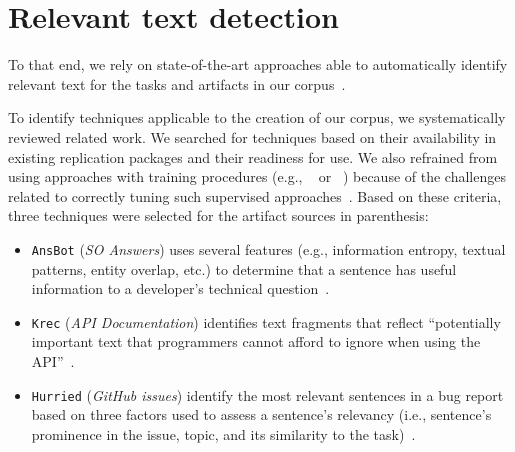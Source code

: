 


\section{Relevant text detection}
\label{cp4:corpus-relevant-text}




To that end, we rely on state-of-the-art approaches able to automatically identify relevant text for the tasks and artifacts in our corpus~\cite{nadi2020, Robillard2015, Lotufo2012, Xu2017}.


To identify techniques applicable to the creation of our corpus, we systematically reviewed related work. We searched for techniques based on their availability in existing replication packages and their readiness for use.
We also refrained from using approaches with training procedures (e.g., ~\cite{liu2020} or ~\cite{Treude2016}) because of the challenges related to correctly tuning such supervised approaches~\cite{Chaparro2017, fucci2019}. Based on these criteria, three techniques were selected for the artifact sources in parenthesis:


\begin{itemize}[leftmargin=\parindent, font=\normalfont\itshape]
    \item \texttt{\acs{AnsBot}} (\textit{SO Answers}) uses several features (e.g., information entropy, textual patterns, entity overlap, etc.) to determine that a sentence has useful information to a developer's technical question~\cite{Xu2017}.
    
    \item \texttt{\acs{Krec}} (\textit{API Documentation}) identifies text fragments that reflect ``potentially important text that programmers cannot afford to ignore when using the API''~\cite{Robillard2015}.
    
    \item \texttt{\acs{Hurried}} (\textit{GitHub issues}) identify the most relevant sentences in a bug report based on three factors used to assess a sentence's relevancy (i.e., sentence's prominence in the issue, topic, and its similarity to the task)~\cite{Lotufo2012}.
\end{itemize}



